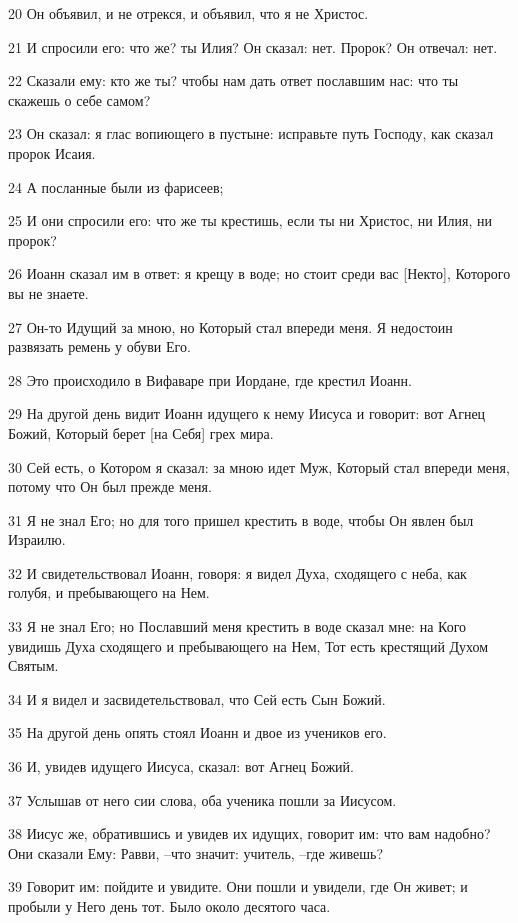 \par 20 Он объявил, и не отрекся, и объявил, что я не Христос.
\par 21 И спросили его: что же? ты Илия? Он сказал: нет. Пророк? Он отвечал: нет.
\par 22 Сказали ему: кто же ты? чтобы нам дать ответ пославшим нас: что ты скажешь о себе самом?
\par 23 Он сказал: я глас вопиющего в пустыне: исправьте путь Господу, как сказал пророк Исаия.
\par 24 А посланные были из фарисеев;
\par 25 И они спросили его: что же ты крестишь, если ты ни Христос, ни Илия, ни пророк?
\par 26 Иоанн сказал им в ответ: я крещу в воде; но стоит среди вас [Некто], Которого вы не знаете.
\par 27 Он-то Идущий за мною, но Который стал впереди меня. Я недостоин развязать ремень у обуви Его.
\par 28 Это происходило в Вифаваре при Иордане, где крестил Иоанн.
\par 29 На другой день видит Иоанн идущего к нему Иисуса и говорит: вот Агнец Божий, Который берет [на Себя] грех мира.
\par 30 Сей есть, о Котором я сказал: за мною идет Муж, Который стал впереди меня, потому что Он был прежде меня.
\par 31 Я не знал Его; но для того пришел крестить в воде, чтобы Он явлен был Израилю.
\par 32 И свидетельствовал Иоанн, говоря: я видел Духа, сходящего с неба, как голубя, и пребывающего на Нем.
\par 33 Я не знал Его; но Пославший меня крестить в воде сказал мне: на Кого увидишь Духа сходящего и пребывающего на Нем, Тот есть крестящий Духом Святым.
\par 34 И я видел и засвидетельствовал, что Сей есть Сын Божий.
\par 35 На другой день опять стоял Иоанн и двое из учеников его.
\par 36 И, увидев идущего Иисуса, сказал: вот Агнец Божий.
\par 37 Услышав от него сии слова, оба ученика пошли за Иисусом.
\par 38 Иисус же, обратившись и увидев их идущих, говорит им: что вам надобно? Они сказали Ему: Равви, --что значит: учитель, --где живешь?
\par 39 Говорит им: пойдите и увидите. Они пошли и увидели, где Он живет; и пробыли у Него день тот. Было около десятого часа.

